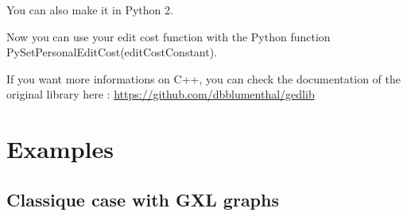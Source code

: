\documentclass[letterpaper,10pt,english]{sphinxmanual}
\begin{document}
You can also make it in Python 2.

Now you can use your edit cost function with the Python function PySetPersonalEditCost(editCostConstant).

If you want more informations on C++, you can check the documentation of the original library here : \url{https://github.com/dbblumenthal/gedlib}


\chapter{Examples}
\label{examples::doc}\label{examples:examples}

\section{Classique case with GXL graphs}
\label{examples:classique-case-with-gxl-graphs}
\end{document}

